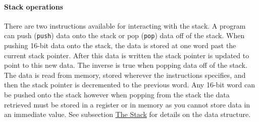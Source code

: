 \documentclass[man,hidelinks,floatsintext]{apa7}
\begin{document}
\paragraph{Stack operations}
\label{sec:stackops}
There are two instructions available for interacting with the stack. A program can push (\verb|push|) data onto the stack or pop (\verb|pop|) data off of the stack. When pushing 16-bit data onto the stack, the data is stored at one word past the current stack pointer. After this data is written the stack pointer is updated to point to this new data. The inverse is true when popping data off of the stack. The data is read from memory, stored wherever the instructions specifies, and then the stack pointer is decremented to the previous word. Any 16-bit word can be pushed onto the stack however when popping from the stack the data retrieved must be stored in a register or in memory as you cannot store data in an immediate value. See subsection \hyperref[sec:stack]{The Stack} for details on the data structure.
\end{document}
